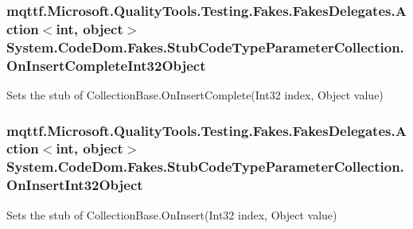 \hypertarget{class_system_1_1_code_dom_1_1_fakes_1_1_stub_code_type_parameter_collection_a40bec13ec66e00ba5eee68211d91d87c}{
\subsubsection[{On\-Insert\-Complete\-Int32\-Object}]{\setlength{\rightskip}{0pt plus 5cm}mqttf.\-Microsoft.\-Quality\-Tools.\-Testing.\-Fakes.\-Fakes\-Delegates.\-Action$<$int, object$>$ System.\-Code\-Dom.\-Fakes.\-Stub\-Code\-Type\-Parameter\-Collection.\-On\-Insert\-Complete\-Int32\-Object}}\label{class_system_1_1_code_dom_1_1_fakes_1_1_stub_code_type_parameter_collection_a40bec13ec66e00ba5eee68211d91d87c}


Sets the stub of Collection\-Base.\-On\-Insert\-Complete(\-Int32 index, Object value)

\hypertarget{class_system_1_1_code_dom_1_1_fakes_1_1_stub_code_type_parameter_collection_ac3b2e81829b31e74d02ccb8d2c259461}{
\subsubsection[{On\-Insert\-Int32\-Object}]{\setlength{\rightskip}{0pt plus 5cm}mqttf.\-Microsoft.\-Quality\-Tools.\-Testing.\-Fakes.\-Fakes\-Delegates.\-Action$<$int, object$>$ System.\-Code\-Dom.\-Fakes.\-Stub\-Code\-Type\-Parameter\-Collection.\-On\-Insert\-Int32\-Object}}\label{class_system_1_1_code_dom_1_1_fakes_1_1_stub_code_type_parameter_collection_ac3b2e81829b31e74d02ccb8d2c259461}


Sets the stub of Collection\-Base.\-On\-Insert(\-Int32 index, Object value)

